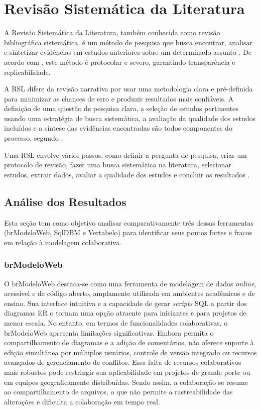 \chapter{Revisão Sistemática da Literatura}

A Revisão Sistemática da Literatura, também conhecida como revisão bibliográfica sistemática, é um método de pesquisa que busca encontrar, analisar e sintetizar evidências em estudos anteriores sobre um determinado assunto \cite{Metologia2015}. De acordo com \cite{RevisaoSistematicaLeitura2016}, este método é protocolar e severo, garantindo transparência e replicabilidade.

A RSL difere da revisão narrativa por usar uma metodologia clara e pré-definida para minimizar as chances de erro e produzir resultados mais confiáveis. A definição de uma questão de pesquisa clara, a seleção de estudos pertinentes usando uma estratégia de busca sistemática, a avaliação da qualidade dos estudos incluídos e a síntese das evidências encontradas são todos componentes do processo, segundo \cite{Kitchenham2004}.

Uma RSL envolve vários passos, como definir a pergunta de pesquisa, criar um protocolo de revisão, fazer uma busca sistemática na literatura, selecionar estudos, extrair dados, avaliar a qualidade dos estudos e concluir os resultados \cite{Peterson2011}.

\section[Análise dos Resultados]{Análise dos Resultados}

Esta seção tem como objetivo analisar comparativamente três dessas ferramentas (brModeloWeb, SqlDBM e Vertabelo) para identificar seus pontos fortes e fracos em relação à modelagem colaborativa.

\subsection[brModeloWeb]{brModeloWeb}

O brModeloWeb destaca-se como uma ferramenta de modelagem de dados \textit{online}, acessível e de código aberto, amplamente utilizada em ambientes acadêmicos e de ensino. Sua interface intuitiva e a capacidade de gerar \textit{scripts} SQL a partir dos diagramas ER o tornam uma opção atraente para iniciantes e para projetos de menor escala. No entanto, em termos de funcionalidades colaborativas, o brModeloWeb apresenta limitações significativas. Embora permita o compartilhamento de diagramas e a adição de comentários, não oferece suporte à edição simultânea por múltiplos usuários, controle de versão integrado ou recursos avançados de gerenciamento de conflitos. Essa falta de recursos colaborativos mais robustos pode restringir sua aplicabilidade em projetos de grande porte ou em equipes geograficamente distribuídas. Sendo assim, a colaboração se resume ao compartilhamento de arquivos, o que não permite a rastreabilidade das alterações e dificulta a colaboração em tempo real.

